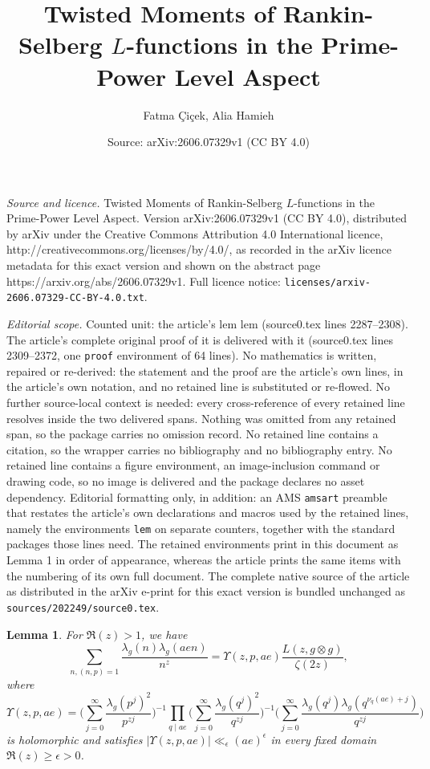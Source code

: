 \documentclass[10pt,a4paper]{amsart}
\title{Twisted Moments of Rankin-Selberg $L$-functions in the Prime-Power Level Aspect}
\author{Fatma \c{C}i\c{c}ek, Alia Hamieh}
\date{Source: arXiv:2606.07329v1 (CC BY 4.0)}
\newtheorem{lem}{Lemma}
\begin{document}
\maketitle

\noindent\emph{Source and licence.} Twisted Moments of Rankin-Selberg $L$-functions in the Prime-Power Level Aspect. Version arXiv:2606.07329v1 (CC BY 4.0), distributed by arXiv under the Creative Commons Attribution 4.0 International licence, http://creativecommons.org/licenses/by/4.0/, as recorded in the arXiv licence metadata for this exact version and shown on the abstract page https://arxiv.org/abs/2606.07329v1. Full licence notice: \texttt{licenses/arxiv-2606.07329-CC-BY-4.0.txt}.\par\smallskip

\noindent\textit{Editorial scope.} Counted unit: the article's lem lem (source0.tex lines 2287--2308). The article's complete original proof of it is delivered with it (source0.tex lines 2309--2372, one \texttt{proof} environment of 64 lines). No mathematics is written, repaired or re-derived: the statement and the proof are the article's own lines, in the article's own notation, and no retained line is substituted or re-flowed.  No further source-local context is needed: every cross-reference of every retained line resolves inside the two delivered spans.  Nothing was omitted from any retained span, so the package carries no omission record.  No retained line contains a citation, so the wrapper carries no bibliography and no bibliography entry.  No retained line contains a figure environment, an image-inclusion command or drawing code, so no image is delivered and the package declares no asset dependency.  Editorial formatting only, in addition: an AMS \texttt{amsart} preamble that restates the article's own declarations and macros used by the retained lines, namely the environments \texttt{lem} on separate counters, together with the standard packages those lines need.  The retained environments print in this document as Lemma 1 in order of appearance, whereas the article prints the same items with the numbering of its own full document.  The complete native source of the article as distributed in the arXiv e-print for this exact version is bundled unchanged as \texttt{sources/202249/source0.tex}.
\begin{lem}
For $\Re(z)>1$, we have 
 \begin{equation*}
    \sum_{n, (n, p)=1}  \frac{\lambda_g(n)  \lambda_g(aen)}{n^{z}}
    =
    \Upsilon(z, p, ae) \frac{L(z, g\otimes g)}{\zeta(2z)},
    \end{equation*}
where \[
    \Upsilon(z, p, ae)
    =  \Big( \sum_{j=0}^\infty
    \frac{\lambda_g(p^j)^2}{p^{zj}}
    \Big)^{-1}
        \prod_{q\mid ae} 
         \Big( \sum_{j=0}^\infty
    \frac{\lambda_g(q^j)^2}{q^{zj}}
    \Big)^{-1}
     \Big( \sum_{j=0}^\infty
    \frac{\lambda_g(q^j) \lambda_g(q^{\nu_{q}(ae)+j})}{q^{zj}}
    \Big)
    \]
is holomorphic and satisfies  $\left|\Upsilon(z, p, ae)\right|\ll_{\epsilon} (ae)^\epsilon$ in every fixed domain  $\Re(z)\geq\epsilon>0$. 
\end{lem}
\end{document}
